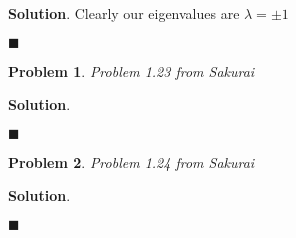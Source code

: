\documentclass[12pt]{article}
\newtheorem{p}{Problem}
\theoremstyle{definition}
\newenvironment{s}{%
        \begin{trivlist} \item \textbf{Solution}. }{%
            \hspace*{\fill} $\blacksquare$\end{trivlist}}%
\begin{document}
{\begin{s}
Clearly our eigenvalues are $\lambda = \pm 1$

\end{s}

\begin{p}
Problem 1.23 from Sakurai
\end{p}

\begin{s} 

\end{s}

\begin{p}
Problem 1.24 from Sakurai
\end{p}

\begin{s} 

\end{s}
\end{document}
